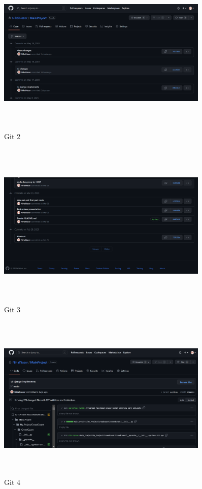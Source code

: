 \documentclass[12pt]{report}
\begin{document}
\begin{figure}[htbp]
  \centering
  \includegraphics [width=0.9\textwidth, height=8cm]{git 2.png}
  \caption{Git 2}
  \label{fig:image}
\end{figure}

\begin{figure}[htbp]
  \centering
  \includegraphics [width=0.9\textwidth, height=8cm]{git 3.png}
  \caption{Git 3}
  \label{fig:image}
\end{figure}

\begin{figure}[htbp]
  \centering
  \includegraphics [width=0.9\textwidth, height=8cm]{git 4.png}
  \caption{Git 4}
  \label{fig:image}
\end{figure}
\end{document}
